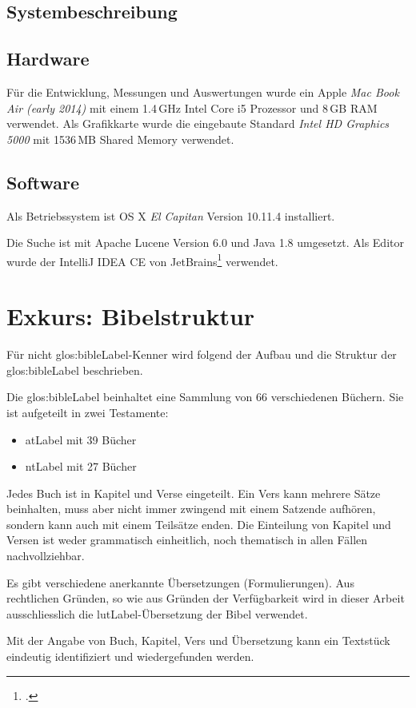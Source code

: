 \subsection{Systembeschreibung}
\subsection{Hardware}
Für die Entwicklung, Messungen und Auswertungen wurde ein Apple \textit{Mac Book Air (early 2014)} mit einem 1.4\,GHz Intel Core i5 Prozessor und 8\,GB RAM verwendet. Als Grafikkarte wurde die eingebaute Standard \textit{Intel HD Graphics 5000} mit 1536\,MB Shared Memory verwendet.

\subsection{Software}
Als Betriebssystem ist OS X \textit{El Capitan} Version 10.11.4  installiert.

Die Suche ist mit Apache Lucene Version 6.0 und Java 1.8 umgesetzt. Als Editor wurde der IntelliJ IDEA CE von JetBrains\footcite{IntelliJ_IDEA_the_Java_IDE_2016-05-09} verwendet.

\section{Exkurs: Bibelstruktur}
Für nicht \gls{glos:bibleLabel}-Kenner wird folgend der Aufbau und die Struktur der \gls{glos:bibleLabel} beschrieben.

Die \gls{glos:bibleLabel} beinhaltet eine Sammlung von 66 verschiedenen Büchern.
Sie ist aufgeteilt in zwei Testamente:
\begin{itemize}
	\item \gls{atLabel} mit 39 Bücher
	\item \gls{ntLabel} mit 27 Bücher
\end{itemize}
Jedes Buch ist in Kapitel und Verse eingeteilt. Ein Vers kann mehrere Sätze beinhalten, muss aber nicht immer zwingend mit einem Satzende aufhören, sondern kann auch mit einem Teilsätze enden.
Die Einteilung von Kapitel und Versen ist weder grammatisch einheitlich, noch thematisch in allen Fällen nachvollziehbar.

Es gibt verschiedene anerkannte Übersetzungen (Formulierungen).
Aus rechtlichen Gründen, so wie aus Gründen der Verfügbarkeit wird in dieser Arbeit ausschliesslich die \gls{lutLabel}-Übersetzung der Bibel verwendet.

Mit der Angabe von Buch, Kapitel, Vers und Übersetzung kann ein Textstück eindeutig identifiziert und wiedergefunden werden.

